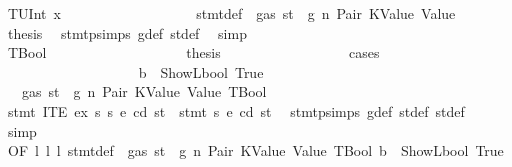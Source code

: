 \begin{isabellebody}
\ {\isacharparenleft}{\kern0pt}TUInt\ x{}{\isacharparenright}{\kern0pt}\isanewline
\ \ \ \ \ \ \ \ \ \ \ \ \ \ \ \ \isamarkupfalse%
\ {}{\isacharparenleft}{\kern0pt}{}{\isacharparenright}{\kern0pt}\ stmt{\isacharunderscore}{\kern0pt}def\ {\isacharbackquoteopen}{\isasymnot}\ gas\ st\ {\isasymle}\ g{\isacharbackquoteclose}\ n\ Pair\ KValue\ Value\ \isamarkupfalse%
\ {\isacharquery}{\kern0pt}thesis\ \isamarkupfalse%
\ stmt{\isachardot}{\kern0pt}psimps{\isacharparenleft}{\kern0pt}{}{\isacharparenright}{\kern0pt}\ g{\isacharunderscore}{\kern0pt}def\ st{\isacharprime}{\kern0pt}{\isacharunderscore}{\kern0pt}def\ \isamarkupfalse%
\ simp\isanewline
\ \ \ \ \ \ \ \ \ \ \ \ \ \ \isamarkupfalse%
\isanewline
\ \ \ \ \ \ \ \ \ \ \ \ \ \ \ \ \isamarkupfalse%
\ TBool\isanewline
\ \ \ \ \ \ \ \ \ \ \ \ \ \ \ \ \isamarkupfalse%
\ \isamarkupfalse%
\ {\isacharquery}{\kern0pt}thesis\isanewline
\ \ \ \ \ \ \ \ \ \ \ \ \ \ \ \ \isamarkupfalse%
\ cases\isanewline
\ \ \ \ \ \ \ \ \ \ \ \ \ \ \ \ \ \ \isamarkupfalse%
\ {\isachardoublequoteopen}b\ {\isacharequal}{\kern0pt}\ ShowL\isactrlsub b\isactrlsub o\isactrlsub o\isactrlsub l\ True{\isachardoublequoteclose}\isanewline
\ \ \ \ \ \ \ \ \ \ \ \ \ \ \ \ \ \ \isamarkupfalse%
\ {}{\isacharparenleft}{\kern0pt}{}{\isacharparenright}{\kern0pt}\ {\isacharbackquoteopen}{\isasymnot}\ gas\ st\ {\isasymle}\ g{\isacharbackquoteclose}\ n\ Pair\ KValue\ Value\ TBool\ \isamarkupfalse%
\ {\isachardoublequoteopen}stmt\ {\isacharparenleft}{\kern0pt}ITE\ ex\ s{}\ s{}{\isacharparenright}{\kern0pt}\ e\ cd\ st\ {\isacharequal}{\kern0pt}\ stmt\ s{}\ e\ cd\ st{\isacharprime}{\kern0pt}{\isacharprime}{\kern0pt}{\isachardoublequoteclose}\ \isamarkupfalse%
\ stmt{\isachardot}{\kern0pt}psimps{\isacharparenleft}{\kern0pt}{}{\isacharparenright}{\kern0pt}\ g{\isacharunderscore}{\kern0pt}def\ st{\isacharprime}{\kern0pt}{\isacharunderscore}{\kern0pt}def\ st{\isacharprime}{\kern0pt}{\isacharprime}{\kern0pt}{\isacharunderscore}{\kern0pt}def\ \isamarkupfalse%
\ simp\isanewline
\ \ \ \ \ \ \ \ \ \ \ \ \ \ \ \ \ \ \isamarkupfalse%
\ {}{\isacharparenleft}{\kern0pt}{}{\isacharparenright}{\kern0pt}{\isacharbrackleft}{\kern0pt}OF\ l{}\ l{}\ l{}{\isacharbrackright}{\kern0pt}\ stmt{\isacharunderscore}{\kern0pt}def\ {\isacharbackquoteopen}{\isasymnot}\ gas\ st\ {\isasymle}\ g{\isacharbackquoteclose}\ n\ Pair\ KValue\ Value\ TBool\ {\isacharbackquoteopen}b\ {\isacharequal}{\kern0pt}\ ShowL\isactrlsub b\isactrlsub o\isactrlsub o\isactrlsub l\ True{\isacharbackquoteclose}\ \isamarkupfalse%

\end{isabellebody}
